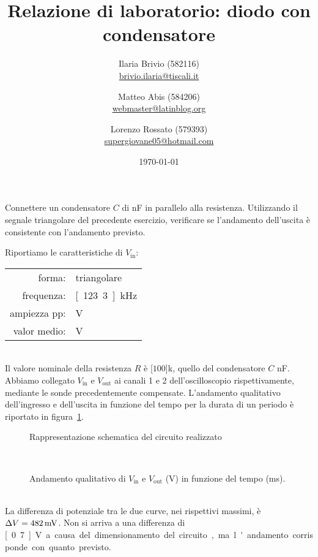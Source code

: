 \documentclass[italian,a4paper]{article}
\begin{document}
\title{Relazione di laboratorio: diodo con condensatore}
\author{\normalsize Ilaria Brivio (582116)\\%
\normalsize \url{brivio.ilaria@tiscali.it}%
\and %
\normalsize Matteo Abis (584206)\\ %
\normalsize \url{webmaster@latinblog.org}
\and %
\normalsize Lorenzo Rossato (579393)\\ %
\normalsize \url{supergiovane05@hotmail.com}}
\date{\today}
\maketitle
\noindent
Connettere un condensatore $C$ di \unit[1]{nF} in parallelo alla resistenza.
Utilizzando il segnale triangolare del precedente esercizio, verificare se
l’andamento dell’uscita è consistente con l’andamento previsto.

Riportiamo le caratteristiche di $V_{\text{in}}$:
\begin{table}[h]
    \centering
    \begin{tabular}{rl}
        forma: & triangolare\\
        frequenza: & \unit[123.3]{kHz}\\
        ampiezza pp: & \unit[10]{V}\\
        valor medio: & \unit[0]{V}
    \end{tabular}
\end{table}\\
Il valore nominale della resistenza $R$ è \unit[$100$]{k\ohm}, quello del condensatore $C$ \unit[1]{nF}. Abbiamo collegato $V_{\text{in}}$ e $V_{\text{out}}$ ai canali 1 e 2 dell'oscilloscopio rispettivamente, mediante le sonde precedentemente compensate.  L'andamento qualitativo dell'ingresso e dell'uscita in funzione del tempo per la durata di un
periodo è riportato in figura~\ref{fig:vinvout}.
\begin{figure}[h]\caption{Rappresentazione schematica del circuito
    realizzato}
    \centering
    
\end{figure}\\
\begin{figure}[h]\caption{Andamento qualitativo di $V_{\text{in}}$ e $V_{\text{out}}$ (\unit{V}) in funzione del tempo (\unit{ms}).}
        \centering                                     
        
    \label{fig:vinvout}
\end{figure}\\
La differenza di potenziale tra le due curve, nei rispettivi massimi, è
$\Delta V = \unit[482]{mV}$. 
Non si arriva a una differenza di
\unit[0.7]{V} a causa del dimensionamento del circuito, ma l'andamento
corrisponde con quanto previsto.
\end{document}
